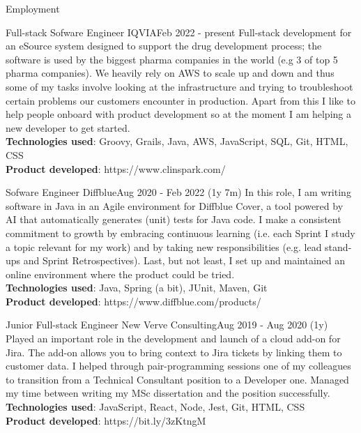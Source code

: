 \documentclass[]{mcdowellcv}
\begin{document}
  \begin{cvsection}{Employment}

	    \begin{cvsubsection}{Full-stack Sofware Engineer }{IQVIA}{Feb 2022 - present}
		  Full-stack development for an eSource system designed to support the drug development process; the software is used by the biggest pharma companies in the world (e.g 3 of top 5 pharma companies). We heavily rely on AWS to scale up and down and thus some of my tasks involve looking at the infrastructure and trying to troubleshoot certain problems our customers encounter in production. Apart from this I like to help people onboard with product development so at the moment I am helping a new developer to get started.
			\\ \textbf{Technologies used}: Groovy, Grails, Java, AWS, JavaScript, SQL, Git, HTML, CSS
			\\ \textbf{Product developed}: https://www.clinspark.com/
		\end{cvsubsection}

   	    \begin{cvsubsection}{Sofware Engineer }{Diffblue}{Aug 2020 - Feb 2022 (1y 7m)}
          In this role, I am writing software in Java in an Agile environment for Diffblue Cover, a tool powered by AI that automatically generates (unit) tests for Java code. I make a consistent commitment to growth by embracing continuous learning (i.e. each Sprint I study a topic relevant for my work) and by taking new responsibilities (e.g. lead stand-ups and Sprint Retrospectives). Last, but not least, I set up and maintained an online environment where the product could be tried.
      		\\ \textbf{Technologies used}: Java, Spring (a bit), JUnit, Maven, Git
	  		\\ \textbf{Product developed}: https://www.diffblue.com/products/
		\end{cvsubsection}

		\begin{cvsubsection}{Junior Full-stack Engineer }{New Verve Consulting}{Aug 2019 - Aug 2020 (1y)} 
          Played an important role in the development and launch of a cloud add-on for Jira. The add-on allows you to bring context to Jira tickets by linking them to customer data. I helped through pair-programming sessions one of my colleagues to transition from a Technical Consultant position to a Developer one. Managed my time between writing my MSc dissertation and the position successfully.
      		\\ \textbf{Technologies used}: JavaScript, React, Node, Jest, Git, HTML, CSS
	  		\\ \textbf{Product developed}: https://bit.ly/3zKtngM
		\end{cvsubsection}



\end{cvsection}
\end{document}
